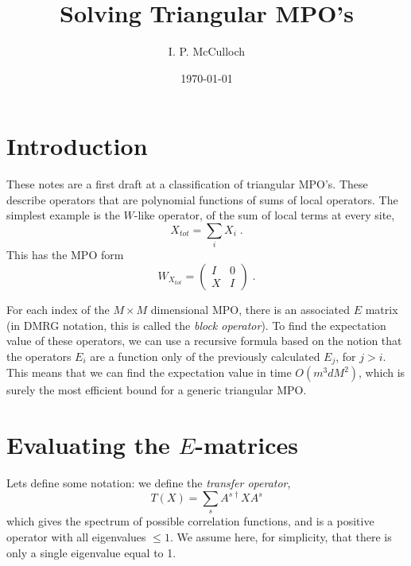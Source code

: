 \documentclass{article}[10pt]
\begin{document}
\title{Solving Triangular MPO's}

\author{I. P. McCulloch}
\date{\today}

\maketitle

\section{Introduction}

These notes are a first draft at a classification of triangular MPO's. 
These describe operators that are polynomial functions of sums of local operators.
The simplest example is the $W$-like operator, of the sum of local terms
at every site,
\begin{equation}
X_{tot} = \sum_i X_i \; .
\end{equation}
This has the MPO form
\begin{equation}
W_{X_{tot}} = \left( \begin{array}{cc} I & 0 \\ X & I \end{array} \right) \; .
\end{equation}

For each index of the $M \times M$ dimensional 
MPO, there is an associated $E$ matrix (in DMRG notation,
this is called the \emph{block operator}).
To find the expectation value of these operators, we can use a recursive formula
based on the notion that the operators $E_i$ are a function only of the
previously calculated $E_j$, for $j > i$. This means that we can find the 
expectation value in time $O(m^3 d M^2)$, which is surely the most efficient
bound for a generic triangular MPO.

\section{Evaluating the $E$-matrices}

Lets define some notation: we define the \emph{transfer operator},
\begin{equation}
T(X) = \sum_s A^{s\dagger} X A^s
\end{equation}
which gives the spectrum of possible correlation functions, and is
a positive operator with all eigenvalues $\leq 1$. We assume here, for
simplicity, that there is only a single eigenvalue equal to 1.
\end{document}
